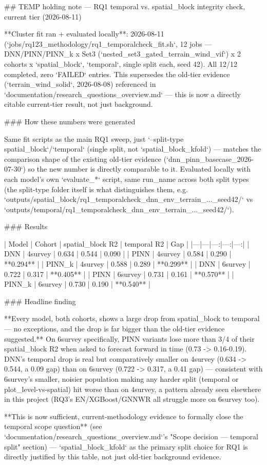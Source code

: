 ## TEMP holding note — RQ1 temporal vs. spatial_block integrity check, current tier (2026-08-11)

**Cluster fit ran + evaluated locally**: 2026-08-11 (`jobs/rq123_methodology/rq1_temporalcheck_fit.sh`,
12 jobs — DNN/PINN/PINN_k x Set3 (`nested_set3_gated_terrain_wind_vif`) x 2 cohorts x
{`spatial_block`, `temporal`}, single split each, seed 42). All 12/12 completed, zero `FAILED`
entries. This supersedes the old-tier evidence (`terrain_wind_solid`, 2026-08-08) referenced in
`documentation/research_questions_overview.md` — this is now a directly citable current-tier
result, not just background.

### How these numbers were generated

Same fit scripts as the main RQ1 sweep, just `--split-type spatial_block`/`temporal` (single
split, not `spatial_block_kfold`) — matches the comparison shape of the existing old-tier
evidence (`dnn_pinn_basecase_2026-07-30`) so the new number is directly comparable to it.
Evaluated locally with each model's own `evaluate_*` script, same run_name across both split
types (the split-type folder itself is what distinguishes them, e.g.
`outputs/spatial_block/rq1_temporalcheck_dnn_env_terrain_..._seed42/` vs
`outputs/temporal/rq1_temporalcheck_dnn_env_terrain_..._seed42/`).

### Results

| Model | Cohort | spatial_block R2 | temporal R2 | Gap |
|---|---|---:|---:|---:|
| DNN | 4survey | 0.634 | 0.544 | 0.090 |
| PINN | 4survey | 0.584 | 0.290 | **0.294** |
| PINN_k | 4survey | 0.588 | 0.289 | **0.299** |
| DNN | 6survey | 0.722 | 0.317 | **0.405** |
| PINN | 6survey | 0.731 | 0.161 | **0.570** |
| PINN_k | 6survey | 0.730 | 0.190 | **0.540** |

### Headline finding

**Every model, both cohorts, shows a large drop from spatial_block to temporal — no exceptions,
and the drop is far bigger than the old-tier evidence suggested.** On 6survey specifically, PINN
variants lose more than 3/4 of their spatial_block R2 when asked to forecast forward in time
(0.73 -> 0.16-0.19). DNN's temporal drop is real but comparatively smaller on 4survey (0.634 ->
0.544, a 0.09 gap) than on 6survey (0.722 -> 0.317, a 0.41 gap) — consistent with 6survey's
smaller, noisier population making any harder split (temporal or plot_level-vs-spatial) hit worse
than on 4survey, a pattern already seen elsewhere in this project (RQ3's EN/XGBoost/GNNWR all
struggle more on 6survey too).

**This is now sufficient, current-methodology evidence to formally close the temporal scope
question** (see `documentation/research_questions_overview.md`'s "Scope decision — temporal
split" section) — `spatial_block_kfold` as the primary split choice for RQ1 is directly justified
by this table, not just old-tier background evidence.
